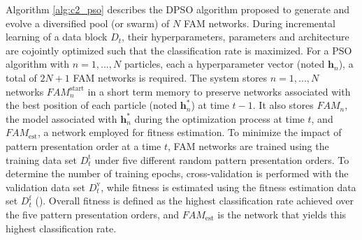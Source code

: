 Algorithm \ref{alg:c2_pso} describes the DPSO algorithm proposed to generate and evolve a diversified pool (or swarm) of $N$ FAM networks.
During incremental learning of a data block $D_t$, their hyperparameters, parameters and architecture are cojointly optimized such that the classification rate is maximized.
For a PSO algorithm with $n=1, ..., N$ particles, each a hyperparameter vector (noted $\textbf{h}_n$), a total of $2N+1$ FAM networks is required.
The system stores $n=1, ..., N$ networks $\textit{FAM}_n^\text{start}$ in a short term memory to preserve networks associated with the best position of each particle (noted $\textbf{h}^*_n$) at time $t-1$.
It also stores $\textit{FAM}_n$, the model associated with $\textbf{h}^*_n$ during the optimization process at time $t$, and $\textit{FAM}_\text{est}$, a network employed for fitness estimation.
To minimize the impact of pattern presentation order at a time $t$, FAM networks are trained using the training data set $D_t^\text{t}$ under five different random pattern presentation orders.
To determine the number of training epochs, cross-validation is performed with the validation data set $D_t^\text{v}$, while fitness is estimated using the fitness estimation data set $D_t^\text{f}$ (\cite{connolly10}).
Overall fitness is defined as the highest classification rate achieved over the five pattern presentation orders, and $\textit{FAM}_\text{est}$ is the network that yields this highest classification rate.

